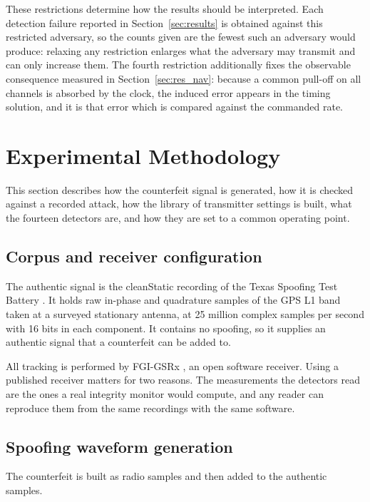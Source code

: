 \documentclass[pdflatex,sn-basic]{sn-jnl}
\theoremstyle{thmstyleone}
\theoremstyle{thmstyletwo}
\theoremstyle{thmstylethree}
\begin{document}
These restrictions determine how the results should be interpreted. Each detection failure
reported in Section~\ref{sec:results} is obtained against this restricted adversary, so the
counts given are the fewest such an adversary would produce: relaxing any restriction
enlarges what the adversary may transmit and can only increase them. The fourth restriction additionally fixes the observable consequence measured
in Section~\ref{sec:res_nav}: because a common pull-off on all channels is absorbed by the
clock, the induced error appears in the timing solution, and it is that error which is
compared against the commanded rate.

\section{Experimental Methodology}
\label{sec:method}

This section describes how the counterfeit signal is generated, how it is checked
against a recorded attack, how the library of transmitter settings is built, what the
fourteen detectors are, and how they are set to a common operating point.

\subsection{Corpus and receiver configuration}
\label{sec:corpus}

The authentic signal is the cleanStatic recording of the Texas Spoofing Test Battery
\citep{humphreys2012texbat}. It holds raw in-phase and quadrature samples of the GPS L1
band taken at a surveyed stationary antenna, at 25 million complex samples per second
with 16 bits in each component. It contains no spoofing, so it supplies an authentic
signal that a counterfeit can be added to.

All tracking is performed by FGI-GSRx \citep{fgigsrx}, an open software receiver. Using
a published receiver matters for two reasons. The measurements the detectors read are
the ones a real integrity monitor would compute, and any reader can reproduce them from
the same recordings with the same software.

\subsection{Spoofing waveform generation}
\label{sec:generator}

The counterfeit is built as radio samples and then added to the authentic samples.
\end{document}
